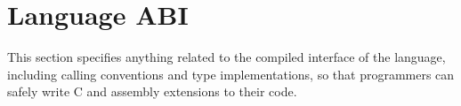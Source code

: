 \section{Language ABI}

This section specifies anything related to the compiled interface of
the language, including calling conventions and type implementations,
so that programmers can safely write C and assembly extensions to their
\gx{} code.
